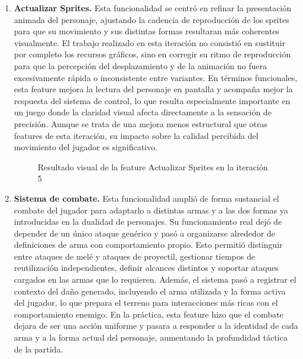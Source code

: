 \begin{enumerate}
\item \textbf{Actualizar Sprites.} Esta funcionalidad se centró en refinar la presentación
animada del personaje, ajustando la cadencia de reproducción de los sprites para que su
movimiento y sus distintas formas resultaran más coherentes visualmente. El trabajo
realizado en esta iteración no consistió en sustituir por completo los recursos gráficos,
sino en corregir su ritmo de reproducción para que la percepción del desplazamiento y de la
animación no fuera excesivamente rápida o inconsistente entre variantes. En términos
funcionales, esta feature mejora la lectura del personaje en pantalla y acompaña mejor la
respuesta del sistema de control, lo que resulta especialmente importante en un juego donde
la claridad visual afecta directamente a la sensación de precisión. Aunque se trata de una
mejora menos estructural que otras features de esta iteración, su impacto sobre la calidad
percibida del movimiento del jugador es significativo.

\begin{figure}[H]
\begin{center}
\caption{Resultado visual de la feature Actualizar Sprites en la iteración 5}
\label{fig:iteracion5-feature-sprites}
\end{center}
\end{figure}

\item \textbf{Sistema de combate.} Esta funcionalidad amplió de forma sustancial el combate
del jugador para adaptarlo a distintas armas y a las dos formas ya introducidas en la
dualidad de personajes. Su funcionamiento real dejó de depender de un único ataque
genérico y pasó a organizarse alrededor de definiciones de arma con comportamiento propio.
Esto permitió distinguir entre ataques de melé y ataques de proyectil, gestionar tiempos de
reutilización independientes, definir alcances distintos y soportar ataques cargados en las
armas que lo requieren. Además, el sistema pasó a registrar el contexto del daño generado,
incluyendo el arma utilizada y la forma activa del jugador, lo que prepara el terreno para
interacciones más ricas con el comportamiento enemigo. En la práctica, esta feature hizo que
el combate dejara de ser una acción uniforme y pasara a responder a la identidad de cada
arma y a la forma actual del personaje, aumentando la profundidad táctica de la partida.


\end{enumerate}
